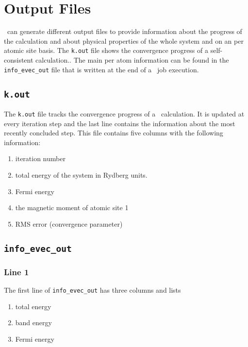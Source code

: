 \chapter{Output Files}

\LSMS\ can generate different output files to provide information about the progress of the calculation and about physical properties of the whole system and on an per atomic site basis.
The \texttt{k.out} file shows the convergence progress of a self-consistent calculation.. The main per atom information can be found in the \texttt{info\_evec\_out} file that is written at the end of a \LSMS\ job execution.

\section{\texttt{k.out}}
The \texttt{k.out} file tracks the convergence progress of a \LSMS\ calculation. It is updated at every iteration step and the last line contains the information about the most recently concluded step.
This file contains five columns with the following information:
\begin{enumerate}
\item iteration number
\item total energy of the system in Rydberg units.
\item Fermi energy
\item the magnetic moment of atomic site 1
\item RMS error (convergence parameter)
\end{enumerate}

\section{\texttt{info\_evec\_out}}
\subsection{Line 1}
The first line of \texttt{info\_evec\_out} has three columns and lists
\begin{enumerate}
\item total energy
\item band energy
\item Fermi energy
\end{enumerate}
